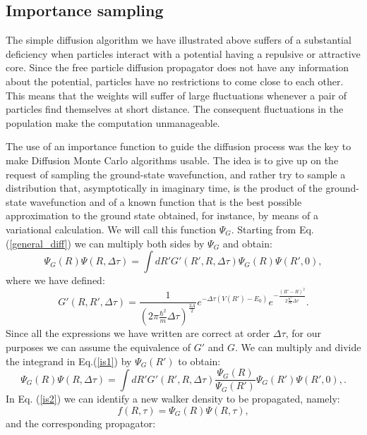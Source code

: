 \subsection{Importance sampling}
The simple diffusion algorithm we have illustrated above suffers of a substantial deficiency when particles interact with a potential having a repulsive or attractive core. Since the free particle diffusion propagator does not have any information about the potential, particles have no restrictions to come close to each other. This means that the weights will suffer of large fluctuations whenever a pair of particles find themselves at short distance. The consequent fluctuations in the population make the computation unmanageable.  

The use of an importance function to guide the diffusion process  \cite{Anderson76}  was the key to make  Diffusion Monte Carlo algorithms usable. The idea is to give up on the request of sampling the ground-state wavefunction, and rather try to sample a distribution that, asymptotically in imaginary time, is the product of the ground-state wavefunction and of a known function that is the best possible approximation to the ground state obtained, for instance, by means of a variational calculation. We will call this function $\Psi_G$. Starting from Eq.(\ref{general_diff}) we can multiply both sides by $\Psi_G$ and obtain:
	\begin{equation}
	\Psi_G(R)\Psi(R,\Delta\tau)=\int dR' G'(R',R,\Delta\tau) \Psi_G(R)\Psi(R',0),\label{is1}
	\end{equation}
where we have defined:
\begin{equation}
G'(R,R',\Delta\tau)=\frac{1}{(2\pi\frac{\hbar^2}{m}\Delta\tau)^\frac{3A}{2}}e^{-\Delta\tau(V(R')-E_0)} e^{-\frac{(R'-R)^2}{2\frac{\hbar^2}{m}\Delta\tau}}.
\end{equation}
Since all the expressions we have written are correct at order $\Delta\tau$, for our purposes we can assume the equivalence of $G'$ and $G$. 
We can multiply and divide the  integrand in Eq.(\ref{is1}) by $\Psi_G(R')$ to obtain:
\begin{equation}
\Psi_G(R)\Psi(R,\Delta\tau)=\int dR' G'(R',R,\Delta\tau) \frac{\Psi_G(R)}{\Psi_G(R')}\Psi_G(R')\Psi(R',0),\label{is2}.
\end{equation}
In Eq. (\ref{is2}) we can identify a new walker density to be propagated, namely:
\begin{equation}
f(R,\tau)=\Psi_G(R)\Psi(R,\tau),
\end{equation}
and the corresponding propagator:

